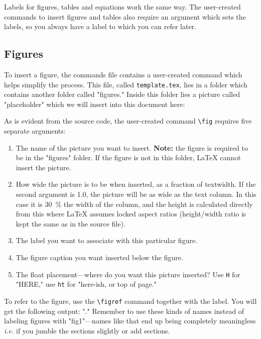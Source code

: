 Labels for figures, tables and equations work the same way. The user-created commands to insert figures and tables also require an argument which sets the labels, so you always have a label to which you can refer later.

\subsection{Figures}\label{sec.figures}

To insert a figure, the commands file contains a user-created command which helps simplify the process. This file, called \verb|template.tex|, lies in a folder which contains another folder called "figures." Inside this folder lies a picture called "placeholder" which we will insert into this document here:


As is evident from the source code, the user-created command \verb|\fig| requires five separate arguments:

\begin{enumerate}
	\item The name of the picture you want to insert. \textbf{Note:} the figure is required to be in the "figures" folder. If the figure is not in this folder, \LaTeX{} cannot insert the picture.
	\item How wide the picture is to be when inserted, as a fraction of textwidth. If the second argument is 1.0, the picture will be as wide as the text column. In this case it is \SI{30}{\percent} the width of the column, and the height is calculated directly from this where \LaTeX{} assumes locked aspect ratios (height/width ratio is kept the same as in the source file).
	\item The label you want to associate with this particular figure.
	\item The figure caption you want inserted below the figure.
	\item The float placement---where do you want this picture inserted? Use \verb|H| for "HERE," use \verb|ht| for "here-ish, or top of page."
\end{enumerate}

To refer to the figure, use the \verb|\figref| command together with the label. You will get the following output: "." Remember to use these kinds of names instead of labeling figures with "fig1"---names like that end up being completely meaningless \textit{i.e.} if you jumble the sections slightly or add sections.

